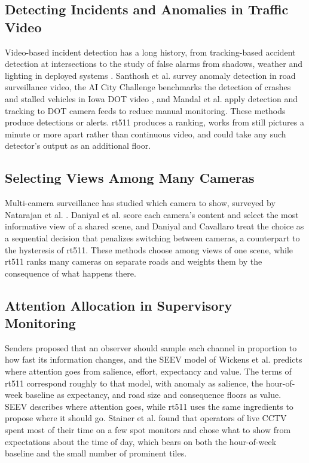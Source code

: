 \documentclass[10pt,journal,compsoc]{IEEEtran}
\begin{document}
\subsection{Detecting Incidents and Anomalies in Traffic Video}
Video-based incident detection has a long history, from tracking-based accident detection at intersections \cite{kamijo2000} to the study of false alarms from shadows, weather and lighting in deployed systems \cite{shehata2008}. Santhosh et al. \cite{santhosh2021} survey anomaly detection in road surveillance video, the AI City Challenge benchmarks the detection of crashes and stalled vehicles in Iowa DOT video \cite{naphade2021}, and Mandal et al. \cite{mandal2020} apply detection and tracking to DOT camera feeds to reduce manual monitoring. These methods produce detections or alerts. rt511 produces a ranking, works from still pictures a minute or more apart rather than continuous video, and could take any such detector's output as an additional floor.

\subsection{Selecting Views Among Many Cameras}
Multi-camera surveillance has studied which camera to show, surveyed by Natarajan et al. \cite{natarajan2015}. Daniyal et al. \cite{daniyal2010} score each camera's content and select the most informative view of a shared scene, and Daniyal and Cavallaro \cite{daniyal2011} treat the choice as a sequential decision that penalizes switching between cameras, a counterpart to the hysteresis of rt511. These methods choose among views of one scene, while rt511 ranks many cameras on separate roads and weights them by the consequence of what happens there.

\subsection{Attention Allocation in Supervisory Monitoring}
Senders \cite{senders1964} proposed that an observer should sample each channel in proportion to how fast its information changes, and the SEEV model of Wickens et al. \cite{wickens2003} predicts where attention goes from salience, effort, expectancy and value. The terms of rt511 correspond roughly to that model, with anomaly as salience, the hour-of-week baseline as expectancy, and road size and consequence floors as value. SEEV describes where attention goes, while rt511 uses the same ingredients to propose where it should go. Stainer et al. \cite{stainer2013} found that operators of live CCTV spent most of their time on a few spot monitors and chose what to show from expectations about the time of day, which bears on both the hour-of-week baseline and the small number of prominent tiles.
\end{document}
